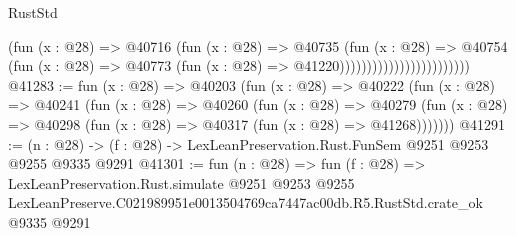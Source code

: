 \begin{lexlean}{RustStd}
\begin{coremodule}
                                          (fun (x : @28) =>
                                          @40716
                                            (fun (x : @28) =>
                                            @40735
                                              (fun (x : @28) =>
                                              @40754
                                                (fun (x : @28) =>
                                                @40773
                                                  (fun (x : @28) => @41220))))))))))))))))))))))))
@41283 := fun (x : @28) =>
  @40203
    (fun (x : @28) =>
    @40222
      (fun (x : @28) =>
      @40241
        (fun (x : @28) =>
        @40260
          (fun (x : @28) =>
          @40279 (fun (x : @28) => @40298 (fun (x : @28) => @40317 (fun (x : @28) => @41268)))))))
@41291 := (n : @28) -> (f : @28) -> LexLeanPreservation.Rust.FunSem @9251 @9253 @9255 @9335 @9291
@41301 := fun (n : @28) =>
  fun (f : @28) =>
  LexLeanPreservation.Rust.simulate
    @9251
    @9253
    @9255
    LexLeanPreserve.C021989951e0013504769ca7447ac00db.R5.RustStd.crate_ok
    @9335
    @9291
\end{coremodule}
\end{lexlean}
